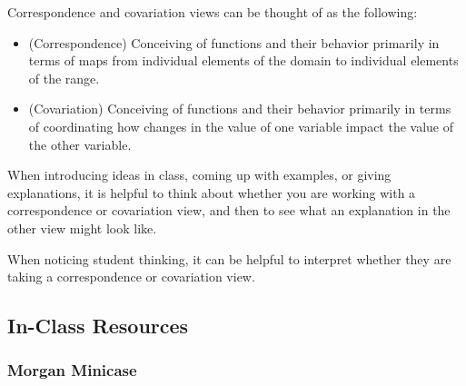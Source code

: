 \documentclass[11pt]{article}
\newcommand{\handout}{\subsubsection}
\newcommand\header[1]{\vspace*{4pt}\par {\large {\bf #1}}\par}
\theoremstyle{definition}
\begin{document}
Correspondence and covariation views can be thought of as the following:
\begin{itemize}
	\item (Correspondence) Conceiving of functions and their behavior primarily in terms of maps from individual elements of the domain to individual elements of the range. 
	\item (Covariation) Conceiving of functions and their behavior primarily in terms of coordinating how changes in the value of one variable impact the value of the other variable.
\end{itemize}

When introducing ideas in class, coming up with examples, or giving explanations, it is helpful to think about whether you are working with a correspondence or covariation view, and then to see what an explanation in the other view might look like. 

When noticing student thinking, it can be helpful to interpret whether they are taking a correspondence or covariation view.

\newpage
\subsection{In-Class Resources}

\handout{Morgan Minicase}
\end{document}
